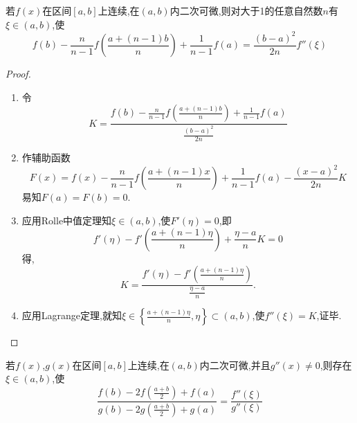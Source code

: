 \vspace{7cm}

\begin{proposition}
	若$f\left( x\right) $在区间$\left[ a,b\right] $上连续,在$\left( a,b\right) $内二次可微,则对大于1的任意自然数$n$有$\xi \in \left( a,b \right) $,使
	$$
		f\left( b \right) -\frac{n}{n-1}f\left( \frac{a+\left( n-1 \right) b}{n} \right) +\frac{1}{n-1}f\left( a \right) =\frac{\left( b-a \right) ^2}{2n}f''\left( \xi \right)
	$$
\end{proposition}

\begin{proof}
	\begin{enumerate}
		\item 令
				$$
					K=\frac{f\left( b \right) -\frac{n}{n-1}f\left( \frac{a+\left( n-1 \right) b}{n} \right) +\frac{1}{n-1}f\left( a \right)}{\frac{\left( b-a \right) ^2}{2n}}
				$$
		\item 作辅助函数
				$$
					F\left( x \right) =f\left( x \right) -\frac{n}{n-1}f\left( \frac{a+\left( n-1 \right) x}{n} \right) +\frac{1}{n-1}f\left( a \right) -\frac{\left( x-a \right) ^2}{2n}K
				$$
				易知$F\left( a \right) =F\left( b \right) =0$.
		\item 应用Rolle中值定理知$\xi \in \left( a,b \right) $,使$F'\left( \eta \right) =0$,即
				$$
					f'\left( \eta \right) -f'\left( \frac{a+\left( n-1 \right) \eta}{n} \right) +\frac{\eta -a}{n}K=0
				$$
				得,
				$$
					K=\frac{f'\left( \eta \right) -f'\left( \frac{a+\left( n-1 \right) \eta}{n} \right)}{\frac{\eta -a}{n}}.
				$$
		\item 应用Lagrange定理,就知$\xi \in \left\{ \frac{ a+\left( n-1 \right) \eta }{n},\eta \right\} \subset \left( a,b \right) $,使$f''\left( \xi \right) =K$,证毕.
	\end{enumerate}
\end{proof}

\begin{proposition}
	若$f\left( x\right)$,$g\left( x\right) $在区间$\left[ a,b\right] $上连续,在$\left( a,b\right) $内二次可微,并且$g''\left( x \right) \ne 0$,则存在$\xi \in \left( a,b \right) $,使
	$$
		\frac{f\left( b \right) -2f\left( \frac{a+b}{2} \right) +f\left( a \right)}{g\left( b \right) -2g\left( \frac{a+b}{2} \right) +g\left( a \right)}=\frac{f''\left( \xi \right)}{g''\left( \xi \right)}
	$$
\end{proposition}

